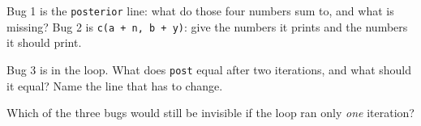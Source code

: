 \documentclass[11pt]{article}
\newcommand{\answerspace}[1]{\vspace{#1}}
\begin{document}
\begin{questions}
\begin{parts}
\item Bug 1 is the \texttt{posterior} line: what do those four numbers sum to, and what is missing?
Bug 2 is \texttt{c(a + n, b + y)}: give the numbers it prints and the numbers it should print.
\answerspace{4.5em}

\item Bug 3 is in the loop. What does \texttt{post} equal after two iterations, and what should it
equal? Name the line that has to change.
\answerspace{3.5em}

\item Which of the three bugs would still be invisible if the loop ran only \emph{one} iteration?
\answerspace{3em}
\end{parts}

\end{questions}
\end{document}

